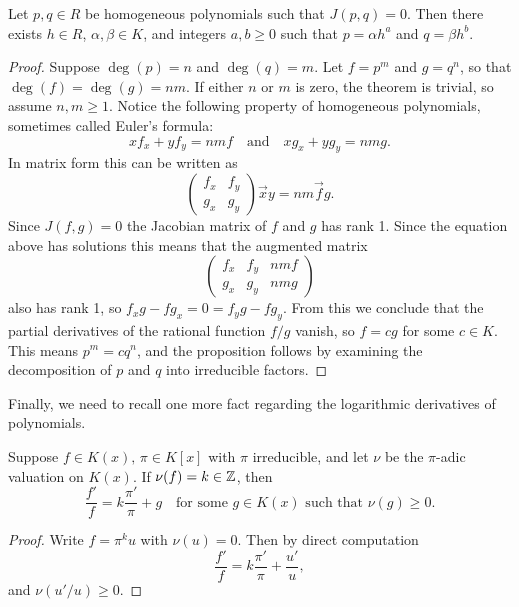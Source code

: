 \documentclass[a4paper,10pt]{amsart}
\begin{document}
\begin{proposition}\label{prop:hom-poly}
  Let \(p,q\in R\) be homogeneous polynomials such that \(J(p,q)=0\). Then there exists \(h\in R\), \(\alpha,\beta\in K\), and integers \(a,b\ge 0\) such that \(p=\alpha h^a\) and \(q=\beta h^b\).
\end{proposition}
\begin{proof}
  Suppose \(\deg(p)=n\) and \(\deg(q)=m\). Let \(f=p^m\) and \(g=q^n\), so that \(\deg(f)=\deg(g)=nm\). If either \(n\) or \(m\) is zero, the theorem is trivial, so assume \(n,m\ge 1\).
  Notice the following property of homogeneous polynomials,
  sometimes called Euler's formula:
  \[xf_x+yf_y=nmf\quad \text{and}\quad xg_x+yg_y=nmg.\]
  In matrix form this can be written as
  \[
    \begin{pmatrix}
      f_x & f_y \\
      g_x & g_y
    \end{pmatrix}\vec{x}{y}=nm\vec{f}{g}.
  \]
  Since \(J(f,g)=0\) the Jacobian matrix of \(f\) and \(g\) has rank 1. Since the equation above has solutions this means that the augmented matrix
  \[\begin{pmatrix}
      f_x & f_y & nmf \\
      g_x & g_y & nmg
    \end{pmatrix}\]
  also has rank 1, so \(f_xg-fg_x=0=f_yg-fg_y\). From this we conclude that the partial derivatives of the rational function \(f/g\) vanish, so \(f=cg\) for some \(c\in K\).
  This means \(p^m=cq^n\), and the proposition follows by examining the decomposition of \(p\) and \(q\) into irreducible factors.
\end{proof}
Finally, we need to recall one more fact regarding the logarithmic derivatives of polynomials.
\begin{proposition}\label{prop:poles}
  Suppose \(f\in K(x),\, \pi\in K[x]\) with \(\pi\) irreducible, and let \(\nu\) be the \(\pi\)-adic valuation on \(K(x)\). If \(\nu(f)=k\in {\ensuremath{\mathbb{Z}}}\), then 
  \[\frac{f'}{f}=k \frac{\pi'}{\pi}+g\quad \text{for some }g\in K(x)\text{ such that }\nu(g)\ge 0.\]
\end{proposition}
\begin{proof}
  Write \(f=\pi^k u\) with \(\nu (u)=0\). Then by direct computation
  \[\frac{f'}{f}=k\frac{\pi'}{\pi}+\frac{u'}{u},\]
  and \(\nu(u'/u)\ge 0\).
\end{proof}

\end{document}
